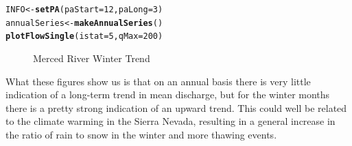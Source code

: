 \documentclass[a4paper,11pt]{article}\usepackage[]{graphicx}\usepackage[]{color}
\makeatletter
\newcommand{\hlnum}[1]{\textcolor[rgb]{0.686,0.059,0.569}{#1}}%
\newcommand{\hlstd}[1]{\textcolor[rgb]{0.345,0.345,0.345}{#1}}%
\newcommand{\hlkwb}[1]{\textcolor[rgb]{0.69,0.353,0.396}{#1}}%
\newcommand{\hlkwc}[1]{\textcolor[rgb]{0.333,0.667,0.333}{#1}}%
\newcommand{\hlkwd}[1]{\textcolor[rgb]{0.737,0.353,0.396}{\textbf{#1}}}%
\newenvironment{kframe}{%
 \def\at@end@of@kframe{}%
 \ifinner\ifhmode%
  \def\at@end@of@kframe{\end{minipage}}%
  \begin{minipage}{\columnwidth}%
 \fi\fi%
 \def\FrameCommand##1{\hskip\@totalleftmargin \hskip-\fboxsep
 \colorbox{shadecolor}{##1}\hskip-\fboxsep
     \hskip-\linewidth \hskip-\@totalleftmargin \hskip\columnwidth}%
 \MakeFramed {\advance\hsize-\width
   \@totalleftmargin\z@ \linewidth\hsize
   \@setminipage}}%
 {\par\unskip\endMakeFramed%
 \at@end@of@kframe}
\newenvironment{knitrout}{}{} %
\makeatother
\begin{document}
\begin{knitrout}
\begin{kframe}
\begin{alltt}
\hlstd{INFO}\hlkwb{<-}\hlkwd{setPA}\hlstd{(}\hlkwc{paStart}\hlstd{=}\hlnum{12}\hlstd{,}\hlkwc{paLong}\hlstd{=}\hlnum{3}\hlstd{)}
\hlstd{annualSeries}\hlkwb{<-}\hlkwd{makeAnnualSeries}\hlstd{()}
\hlkwd{plotFlowSingle}\hlstd{(}\hlkwc{istat}\hlstd{=}\hlnum{5}\hlstd{,}\hlkwc{qMax}\hlstd{=}\hlnum{200}\hlstd{)}
\end{alltt}
\end{kframe}\begin{figure}[]
\caption[Merced River Winter Trend]{Merced River Winter Trend\label{fig:Merced}}
\end{figure}


\end{knitrout}

What these figures show us is that on an annual basis there is very little indication of a long-term trend in mean discharge, but for the winter months there is a pretty strong indication of an upward trend.  This could well be related to the climate warming in the Sierra Nevada, resulting in a general increase in the ratio of rain to snow in the winter and more thawing events.
\end{document}
